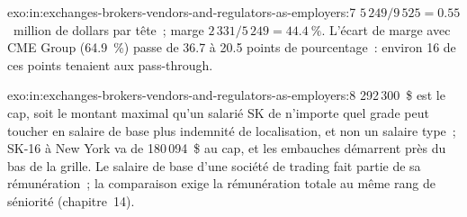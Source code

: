 \begin{solution}{exo:in:exchanges-brokers-vendors-and-regulators-as-employers:7}
$5\,249/9\,525=0.55$~million de dollars par tête~; marge $2\,331/5\,249=44.4~\%$. L'écart de marge avec CME Group (64.9~\%) passe de
36.7 à 20.5 points de pourcentage~: environ 16 de ces points tenaient aux pass-through.
\end{solution}

\begin{solution}{exo:in:exchanges-brokers-vendors-and-regulators-as-employers:8}
292\,300~\$ est le cap, soit le montant maximal qu'un salarié SK de n'importe quel grade peut toucher en salaire de base plus indemnité de localisation, et non un salaire type~;
SK-16 à New York va de 180\,094~\$ au cap, et les embauches démarrent près du bas de la grille. Le salaire de base d'une société de trading fait partie
de sa rémunération~; la comparaison exige la rémunération totale au même rang de séniorité (chapitre~14).
\end{solution}

